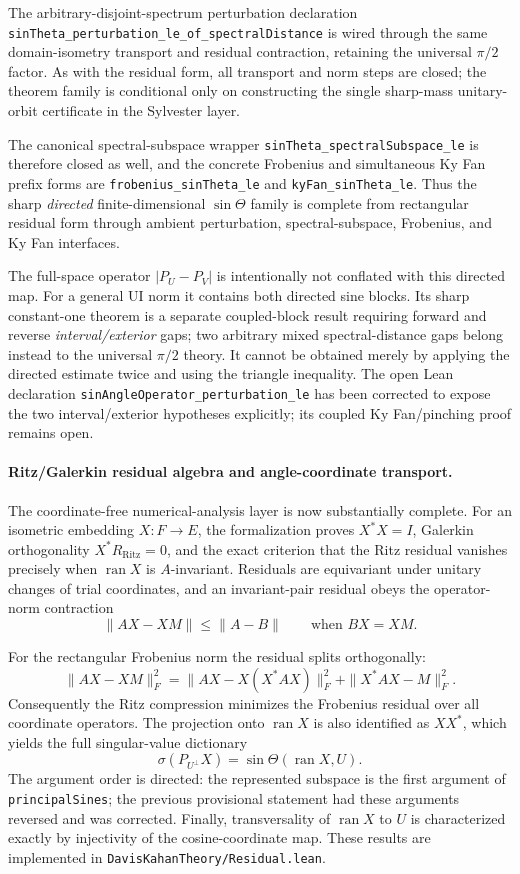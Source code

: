 \documentclass[11pt]{article}
\theoremstyle{remark}
\begin{document}
The arbitrary-disjoint-spectrum perturbation declaration
\texttt{sinTheta\_perturbation\_le\_of\_}\allowbreak\texttt{spectralDistance} is wired through
the same domain-isometry transport and residual contraction, retaining the
universal $\pi/2$ factor.  As with the residual form, all transport and norm
steps are closed; the theorem family is conditional only on constructing the
single sharp-mass unitary-orbit certificate in the Sylvester layer.

The canonical spectral-subspace wrapper
\texttt{sinTheta\_spectralSubspace\_le} is therefore closed as well, and
the concrete Frobenius and simultaneous Ky Fan prefix forms are
\texttt{frobenius\_sinTheta\_le} and
\texttt{kyFan\_sinTheta\_le}.  Thus the sharp \emph{directed} finite-dimensional
$\sin\Theta$ family is complete from rectangular residual form through
ambient perturbation, spectral-subspace, Frobenius, and Ky Fan interfaces.

The full-space operator $|P_U-P_V|$ is intentionally not conflated with this
directed map.  For a general UI norm it contains both directed sine blocks.
Its sharp constant-one theorem is a separate coupled-block result requiring
forward and reverse \emph{interval/exterior} gaps; two arbitrary mixed
spectral-distance gaps belong instead to the universal $\pi/2$ theory.  It
cannot be obtained merely by applying the directed estimate twice and using
the triangle inequality.  The open Lean declaration
\texttt{sinAngleOperator\_perturbation\_le} has been corrected to expose the
two interval/exterior hypotheses explicitly; its coupled Ky Fan/pinching proof
remains open.

\paragraph{Ritz/Galerkin residual algebra and angle-coordinate transport.}
The coordinate-free numerical-analysis layer is now substantially complete.
For an isometric embedding $X:F\to E$, the formalization proves
$X^*X=I$, Galerkin orthogonality $X^*R_{\mathrm{Ritz}}=0$, and the exact
criterion that the Ritz residual vanishes precisely when $\operatorname{ran}X$
is $A$-invariant.  Residuals are equivariant under unitary changes of trial
coordinates, and an invariant-pair residual obeys the operator-norm contraction
\[
  \|AX-XM\| \le \|A-B\|
  \qquad\text{when }BX=XM.
\]

For the rectangular Frobenius norm the residual splits orthogonally:
\[
  \|AX-XM\|_F^2
  = \|AX-X(X^*AX)\|_F^2 + \|X^*AX-M\|_F^2.
\]
Consequently the Ritz compression minimizes the Frobenius residual over all
coordinate operators.  The projection onto $\operatorname{ran}X$ is also
identified as $XX^*$, which yields the full singular-value dictionary
\[
  \sigma(P_{U^\perp}X)
  = \sin\Theta(\operatorname{ran}X,U).
\]
The argument order is directed: the represented subspace is the first argument
of \texttt{principalSines}; the previous provisional statement had these
arguments reversed and was corrected.  Finally, transversality of
$\operatorname{ran}X$ to $U$ is characterized exactly by injectivity of the
cosine-coordinate map.  These results are implemented in
\texttt{DavisKahanTheory/Residual.lean}.
\end{document}

